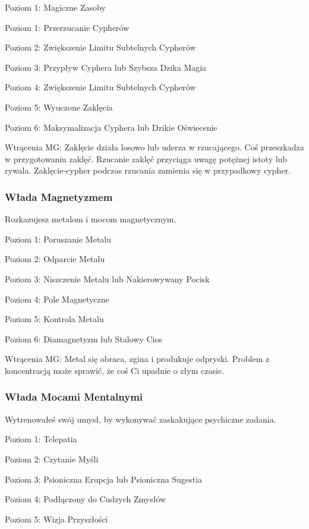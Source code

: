 Poziom 1: Magiczne Zasoby

Poziom 1: Przerzucanie Cypherów

Poziom 2: Zwiększenie Limitu Subtelnych Cypherów

Poziom 3: Przypływ Cyphera lub Szybsza Dzika Magia

Poziom 4: Zwiększenie Limitu Subtelnych Cypherów

Poziom 5: Wyuczone Zaklęcia

Poziom 6: Maksymalizacja Cyphera lub Dzikie Oświecenie

Wtrącenia MG: Zaklęcie działa losowo lub uderza w rzucającego. Coś przeszkadza w przygotowaniu zaklęć. Rzucanie zaklęć przyciąga uwagę potężnej istoty lub rywala.  Zaklęcie-cypher podczas rzucania zamienia się w przypadkowy cypher. 

\subsubsection{Włada Magnetyzmem}

Rozkazujesz metalom i mocom magnetycznym.

Poziom 1: Poruszanie Metalu

Poziom 2: Odparcie Metalu

Poziom 3: Niszczenie Metalu lub Nakierowywany Pocisk

Poziom 4: Pole Magnetyczne

Poziom 5: Kontrola Metalu

Poziom 6: Diamagnetyzm lub Stalowy Cios

Wtrącenia MG: Metal się obraca, zgina i produkuje odpryski. Problem z koncentracją może sprawić, że coś Ci upadnie o złym czasie. 

\subsubsection{Włada Mocami Mentalnymi}

Wytrenowałeś swój umysł, by wykonywać zaskakujące psychiczne zadania. 

Poziom 1: Telepatia

Poziom 2: Czytanie Myśli

Poziom 3: Psioniczna Erupcja lub Psioniczna Sugestia

Poziom 4: Podłączony do Cudzych Zmysłów

Poziom 5: Wizja Przyszłości


